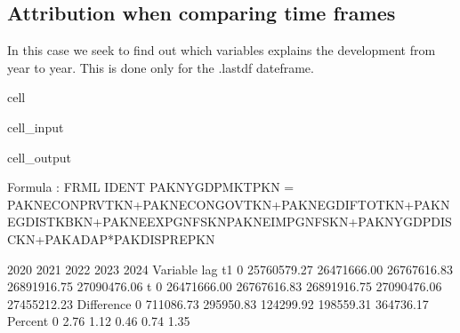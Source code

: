 \documentclass[letterpaper,10pt,english]{jupyterBook}
\begin{document}
\subsection{Attribution when comparing time frames}
\label{\detokenize{content/06_ModelAnalytics/Attribution:attribution-when-comparing-time-frames}}
\sphinxAtStartPar
In this case we seek to find out which variables explains the development from year to year. This is done only for the .lastdf dateframe.

\begin{sphinxuseclass}{cell}\begin{sphinxVerbatimInput}

\begin{sphinxuseclass}{cell_input}
\begin{sphinxVerbatim}[commandchars=\\\{\}]
 
    \PYG{p}{[}\PYG{p}{]}
\end{sphinxVerbatim}

\end{sphinxuseclass}\end{sphinxVerbatimInput}
\begin{sphinxVerbatimOutput}

\begin{sphinxuseclass}{cell_output}
\begin{sphinxVerbatim}[commandchars=\\\{\}]
Formula        : FRML \PYGZlt{}IDENT\PYGZgt{} PAKNYGDPMKTPKN = PAKNECONPRVTKN+PAKNECONGOVTKN+PAKNEGDIFTOTKN+PAKNEGDISTKBKN+PAKNEEXPGNFSKN\PYGZhy{}PAKNEIMPGNFSKN+PAKNYGDPDISCKN+PAKADAP*PAKDISPREPKN \PYGZdl{} 

                      2020        2021        2022        2023        2024
Variable   lag                                                            
t\PYGZhy{}1        0   25760579.27 26471666.00 26767616.83 26891916.75 27090476.06
t          0   26471666.00 26767616.83 26891916.75 27090476.06 27455212.23
Difference 0     711086.73   295950.83   124299.92   198559.31   364736.17
Percent    0          2.76        1.12        0.46        0.74        1.35


\end{sphinxVerbatim}
\end{sphinxuseclass}
\end{sphinxVerbatimOutput}
\end{sphinxuseclass}
\end{document}
